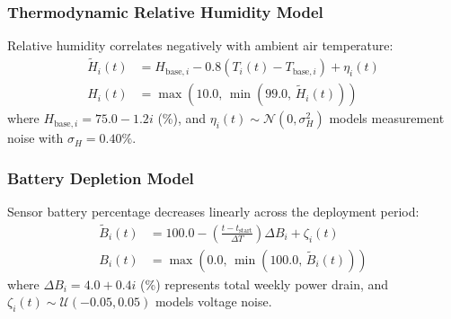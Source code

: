 \documentclass[conference,a4paper]{IEEEtran}
\begin{document}
\subsubsection{Thermodynamic Relative Humidity Model}
Relative humidity correlates negatively with ambient air temperature:
\begin{equation}
\begin{split}
    \tilde{H}_i(t) &= H_{\mathrm{base}, i} - 0.8\left(T_i(t) - T_{\mathrm{base}, i}\right) + \eta_i(t) \\
    H_i(t) &= \max\left(10.0, \, \min(99.0, \, \tilde{H}_i(t))\right)
\end{split}
\end{equation}
where $H_{\mathrm{base}, i} = 75.0 - 1.2i$ (\%), and $\eta_i(t) \sim \mathcal{N}(0, \sigma_H^2)$ models measurement noise with $\sigma_H = 0.40\%$.

\subsubsection{Battery Depletion Model}
Sensor battery percentage decreases linearly across the deployment period:
\begin{equation}
\begin{split}
    \tilde{B}_i(t) &= 100.0 - \left(\frac{t - t_{\mathrm{start}}}{\Delta T}\right)\Delta B_i + \zeta_i(t) \\
    B_i(t) &= \max\left(0.0, \, \min(100.0, \, \tilde{B}_i(t))\right)
\end{split}
\end{equation}
where $\Delta B_i = 4.0 + 0.4i$ (\%) represents total weekly power drain, and $\zeta_i(t) \sim \mathcal{U}(-0.05, 0.05)$ models voltage noise.
\end{document}
